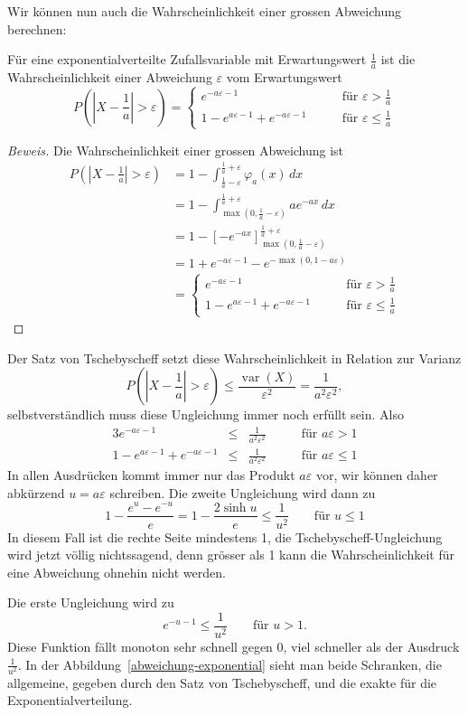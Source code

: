 {
\small
Wir können nun auch die Wahrscheinlichkeit einer grossen Abweichung
berechnen:
\begin{satz} Für eine exponentialverteilte Zufallsvariable mit
Erwartungswert $\frac1a$ ist die Wahrscheinlichkeit einer Abweichung
$\varepsilon$ vom Erwartungswert
\[
P(|X-{\textstyle\frac1a}|>\varepsilon)=
\begin{cases}
e^{-a\varepsilon-1}&\qquad\text{für $\varepsilon > \frac1a$}\\
1-e^{a\varepsilon-1}+e^{-a\varepsilon-1}&\qquad\text{für $\varepsilon \le \frac1a$}
\end{cases}
\]
\end{satz}
\begin{proof}[Beweis]
Die Wahrscheinlichkeit einer grossen Abweichung ist
\begin{align*}
P(|X-{\textstyle\frac1a}|>\varepsilon)
&=1-\int_{\frac1a-\varepsilon}^{\frac1a+\varepsilon}\varphi_a(x)\,dx\\
&=1-\int_{\max(0,\frac1a-\varepsilon)}^{\frac1a+\varepsilon}ae^{-ax}\,dx\\
&=1-\left[-e^{-ax}\right]_{\max(0,\frac1a-\varepsilon)}^{\frac1a+\varepsilon}\\
&=1+e^{-a\varepsilon-1}-e^{-\max(0,1-a\varepsilon)}\\
&=\begin{cases}
e^{-a\varepsilon-1}&\qquad\text{für $\varepsilon > \frac1a$}\\
1-e^{a\varepsilon-1}+e^{-a\varepsilon-1}&\qquad\text{für $\varepsilon \le \frac1a$}
\end{cases}
\end{align*}
\end{proof}
Der Satz von Tschebyscheff setzt diese Wahrscheinlichkeit in Relation
zur Varianz
\[
P(|X-{\textstyle\frac1a}|>\varepsilon)\le
\frac{\operatorname{var}(X)}{\varepsilon^2}=\frac{1}{a^2\varepsilon^2},
\]
selbstverständlich muss diese Ungleichung immer noch erfüllt sein.
Also
\begin{alignat*}{3}
e^{-a\varepsilon-1}&\le&\frac1{a^2\varepsilon^2}&\qquad\text{für $a\varepsilon>1$}\\
1-e^{a\varepsilon-1}+e^{-a\varepsilon-1}&\le&\frac1{a^2\varepsilon^2}&\qquad\text{für $a\varepsilon\le1$}
\end{alignat*}
In allen Ausdrücken kommt immer nur das Produkt $a\varepsilon$ vor,
wir können daher
abkürzend $u=a\varepsilon$ schreiben.
Die zweite Ungleichung wird dann zu
\[
1-\frac{e^{u}-e^{-u}}e=1-\frac{2\sinh u}{e}\le\frac1{u^2}\qquad\text{für $u\le1$}
\]
In diesem Fall ist die rechte Seite mindestens 1,
die Tschebyscheff-Ungleichung wird jetzt völlig nichtssagend, denn 
grösser als 1 kann die Wahrscheinlichkeit für eine Abweichung ohnehin
nicht werden.

Die erste Ungleichung wird zu
\[
e^{-u-1}\le\frac1{u^2}\qquad\text{für $u > 1$}.
\]
Diese Funktion fällt monoton sehr schnell gegen 0, viel schneller
als der Ausdruck $\frac1{u^2}$.
In der Abbildung~\ref{abweichung-exponential}
sieht man beide Schranken, die allgemeine, gegeben durch den
Satz von Tschebyscheff, und die exakte für die Exponentialverteilung.
}

